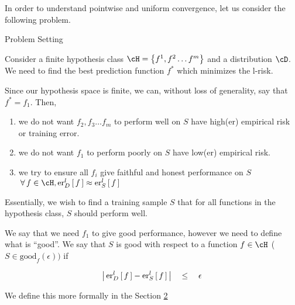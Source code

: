 \documentclass{article}
\begin{document}
\makeheader%

In order to understand pointwise and uniform convergence, let us consider the following problem.

\begin{ssection}[1]{Problem Setting}

	Consider a finite hypothesis class $\cH = \set{f^1, f^2 \dots f^m}$ and a distribution $\cD$. We need to find the best prediction function $f^\ast$ which minimizes the l-risk.

	Since our hypothesis space is finite, we can, without loss of generality, say that $f^\ast = f_1$. Then,

	\begin{enumerate}[label=(\roman*)]
		\item we do not want $f_2, f_3 \dots f_m$ to perform well on $S$ \ie have high(er) empirical risk or training error.
		\item we do not want $f_1$ to perform poorly on $S$ \ie have low(er) empirical risk.
		\item we try to ensure all $f_i$ give faithful and honest performance on $S$ \ie $\qforall f \in \cH, \err[_D^l]{f} \approx \err[_S^l]{f}$
	\end{enumerate}

	Essentially, we wish to find a training sample $S$ that for all functions in the hypothesis class, $S$ should perform well.

	We say that we need $f_1$ to give good performance, however we need to define what is ``good''. We say that $S$ is good with respect to a function $f \in \cH$ ($S \in \text{good}_f(\epsilon))$ if

	\begin{align*}
		\abs{\err[_D^l]{f} - \err[_S^l]{f}}	\qle	\epsilon
	\end{align*} \sbr

	We define this more formally in the Section \hyperlink{sec:2}{2} \br


\end{ssection}
\end{document}
